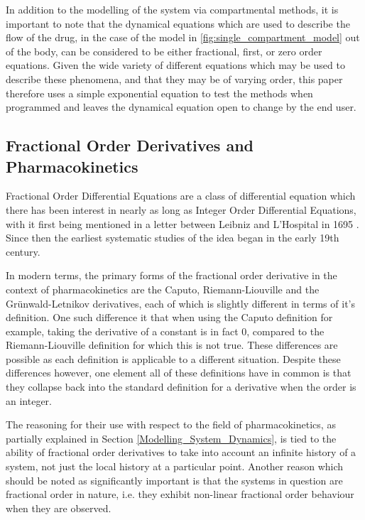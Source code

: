 In addition to the modelling of the system via compartmental methods, it is important to note that the dynamical equations which are used to describe the flow of the drug, in the case of the model in \ref{fig:single_compartment_model} out of the body, can be considered to be either fractional, first, or zero order equations. Given the wide variety of different equations which may be used to describe these phenomena, and that they may be of varying order, this paper therefore uses a simple exponential equation to test the methods when programmed and leaves the dynamical equation open to change by the end user.

\subsection{Fractional Order Derivatives and Pharmacokinetics}\label{fod_and_pharmacokinetics}

Fractional Order Differential Equations are a class of differential equation which there has been interest in nearly as long as Integer Order Differential Equations, with it first being mentioned in a letter between Leibniz and L'Hospital in 1695 \cite{the_fractional_calculus}. Since then the earliest systematic studies of the idea began in the early 19th century. 

In modern terms, the primary forms of the fractional order derivative in the context of pharmacokinetics are the Caputo, Riemann-Liouville and the Gr\"{u}nwald-Letnikov derivatives, each of which is slightly different in terms of it's definition. One such difference it that when using the Caputo definition for example, taking the derivative of a constant is in fact 0, compared to the Riemann-Liouville definition for which this is not true. These differences are possible as each definition is applicable to a different situation. Despite these differences however, one element all of these definitions have in common is that they collapse back into the standard definition for a derivative when the order is an integer. 

The reasoning for their use with respect to the field of pharmacokinetics, as partially explained in Section \ref{Modelling_System_Dynamics}, is tied to the ability of fractional order derivatives to take into account an infinite history of a system, not just the local history at a particular point. Another reason which should be noted as significantly important is that the systems in question are fractional order in nature, i.e. they exhibit non-linear fractional order behaviour when they are observed.

